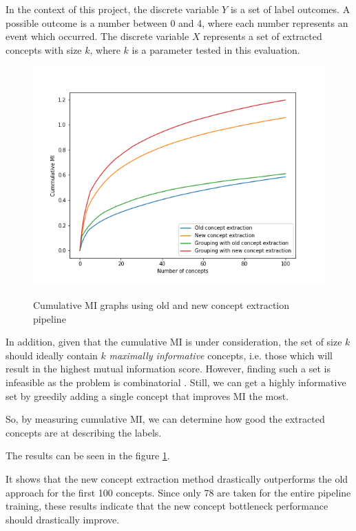In the context of this project, the discrete variable $Y$ is a set of label outcomes. A possible outcome is a number between 0 and 4, where each number represents an event which occurred.
The discrete variable $X$ represents a set of extracted concepts with size $k$, where $k$ is a parameter tested in this evaluation.

\begin{figure}[h]
\caption{Cumulative MI graphs using old and new concept extraction pipeline}
\centering
\includegraphics[width=\textwidth]{concept-bottleneck-pipeline/Cummulative MI graphs.png}
\label{cummulative-mi-graphs}
\end{figure}

In addition, given that the cumulative MI is under consideration, the set of size $k$ should ideally contain $k$ \emph{maximally informative} concepts, i.e. those which will result in the highest mutual information score.
However, finding such a set is infeasible as the problem is combinatorial \cite{RefWorks:RefID:16-2021automatic}. Still, we can get a highly informative set by greedily adding a single concept that improves MI the most. 

So, by measuring cumulative MI, we can determine how good the extracted concepts are at describing the labels.

The results can be seen in the figure \ref{cummulative-mi-graphs}.



It shows that the new concept extraction method drastically outperforms the old approach for the first 100 concepts.
Since only 78 are taken for the entire pipeline training, these results indicate that the new concept bottleneck performance should drastically improve.



